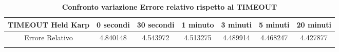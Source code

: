 \begin{longtable}{|c|c|c|c|c|c|c|}
\hline
\textbf{TIMEOUT Held Karp} & \textbf{0 secondi} & \textbf{30 secondi} & \textbf{1 minuto} & \textbf{3 minuti} & \textbf{5 minuti} & \textbf{20 minuti} \\ \hline
Errore Relativo            & 4.840148           & 4.543972            & 4.513275          & 4.489914          & 4.468247          & 4.427877           \\ \hline
\caption{\textbf{Confronto variazione Errore relativo rispetto al TIMEOUT}}
\end{longtable}